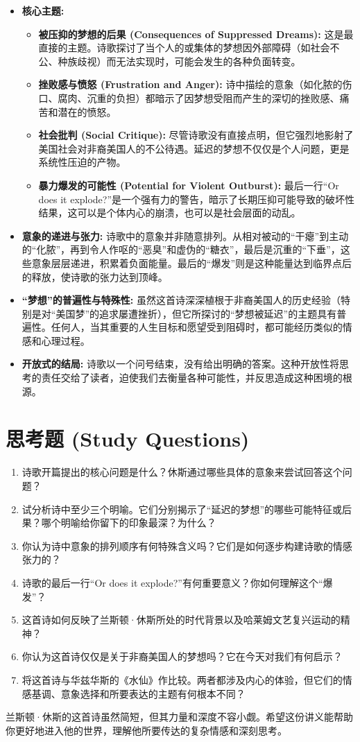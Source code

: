 \documentclass[12pt, a4paper]{article}
\begin{document}
\begin{itemize}
    \item \textbf{核心主题:}
        \begin{itemize}
            \item \textbf{被压抑的梦想的后果 (Consequences of Suppressed Dreams):} 这是最直接的主题。诗歌探讨了当个人的或集体的梦想因外部障碍（如社会不公、种族歧视）而无法实现时，可能会发生的各种负面转变。
            \item \textbf{挫败感与愤怒 (Frustration and Anger):} 诗中描绘的意象（如化脓的伤口、腐肉、沉重的负担）都暗示了因梦想受阻而产生的深切的挫败感、痛苦和潜在的愤怒。
            \item \textbf{社会批判 (Social Critique):} 尽管诗歌没有直接点明，但它强烈地影射了美国社会对非裔美国人的不公待遇。延迟的梦想不仅仅是个人问题，更是系统性压迫的产物。
            \item \textbf{暴力爆发的可能性 (Potential for Violent Outburst):} 最后一行“Or does it explode?”是一个强有力的警告，暗示了长期压抑可能导致的破坏性结果，这可以是个体内心的崩溃，也可以是社会层面的动乱。
        \end{itemize}
    \item \textbf{意象的递进与张力:} 诗歌中的意象并非随意排列。从相对被动的“干瘪”到主动的“化脓”，再到令人作呕的“恶臭”和虚伪的“糖衣”，最后是沉重的“下垂”，这些意象层层递进，积累着负面能量。最后的“爆发”则是这种能量达到临界点后的释放，使诗歌的张力达到顶峰。
    \item \textbf{“梦想”的普遍性与特殊性:} 虽然这首诗深深植根于非裔美国人的历史经验（特别是对“美国梦”的追求屡遭挫折），但它所探讨的“梦想被延迟”的主题具有普遍性。任何人，当其重要的人生目标和愿望受到阻碍时，都可能经历类似的情感和心理过程。
    \item \textbf{开放式的结局:} 诗歌以一个问号结束，没有给出明确的答案。这种开放性将思考的责任交给了读者，迫使我们去衡量各种可能性，并反思造成这种困境的根源。
\end{itemize}

\section{思考题 (Study Questions)}

\begin{enumerate}
    \item 诗歌开篇提出的核心问题是什么？休斯通过哪些具体的意象来尝试回答这个问题？
    \item 试分析诗中至少三个明喻。它们分别揭示了“延迟的梦想”的哪些可能特征或后果？哪个明喻给你留下的印象最深？为什么？
    \item 你认为诗中意象的排列顺序有何特殊含义吗？它们是如何逐步构建诗歌的情感张力的？
    \item 诗歌的最后一行“Or does it explode?”有何重要意义？你如何理解这个“爆发”？
    \item 这首诗如何反映了兰斯顿·休斯所处的时代背景以及哈莱姆文艺复兴运动的精神？
    \item 你认为这首诗仅仅是关于非裔美国人的梦想吗？它在今天对我们有何启示？
    \item 将这首诗与华兹华斯的《水仙》作比较。两者都涉及内心的体验，但它们的情感基调、意象选择和所要表达的主题有何根本不同？
\end{enumerate}

兰斯顿·休斯的这首诗虽然简短，但其力量和深度不容小觑。希望这份讲义能帮助你更好地进入他的世界，理解他所要传达的复杂情感和深刻思考。
\end{document}
